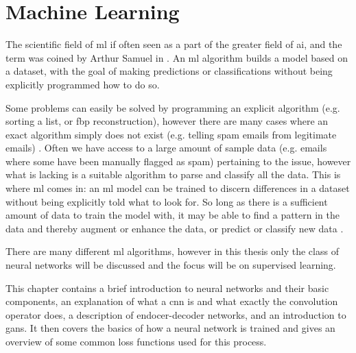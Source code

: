 \chapter{Machine Learning}
\label{sec:ml}
The scientific field of \acrfull{ml} if often seen as a part of the greater field of \acrfull{ai}\cite[3]{Alpaydin10}, and the term was coined by Arthur Samuel in \citeyear{samuelmachinelearning} \cite{samuelmachinelearning}. An \acrshort{ml} algorithm builds a model based on a dataset, with the goal of making predictions or classifications without being explicitly programmed how to do so. 

Some problems can easily be solved by programming an explicit algorithm (e.g. sorting a list, or \acrshort{fbp} reconstruction), however there are many cases where an exact algorithm simply does not exist (e.g. telling spam emails from legitimate emails) \cite[1]{Alpaydin10}. Often we have access to a large amount of sample data (e.g. emails where some have been manually flagged as spam) pertaining to the issue, however what is lacking is a suitable algorithm to parse and classify all the data. This is where \acrshort{ml} comes in: an \acrshort{ml} model can be trained to discern differences in a dataset without being explicitly told what to look for. So long as there is a sufficient amount of data to train the model with, it may be able to find a pattern in the data and thereby augment or enhance the data, or predict or classify new data \cite[2-4]{Alpaydin10}. 

There are many different \acrshort{ml} algorithms, however in this thesis only the class of neural networks will be discussed and the focus will be on supervised learning. 

This chapter contains a brief introduction to neural networks and their basic components, an explanation of what a \acrlong{cnn} is and what exactly the convolution operator does, a description of endocer-decoder networks, and an introduction to \acrlong{gan}s. It then covers the basics of how a neural network is trained and gives an overview of some common loss functions used for this process. 

